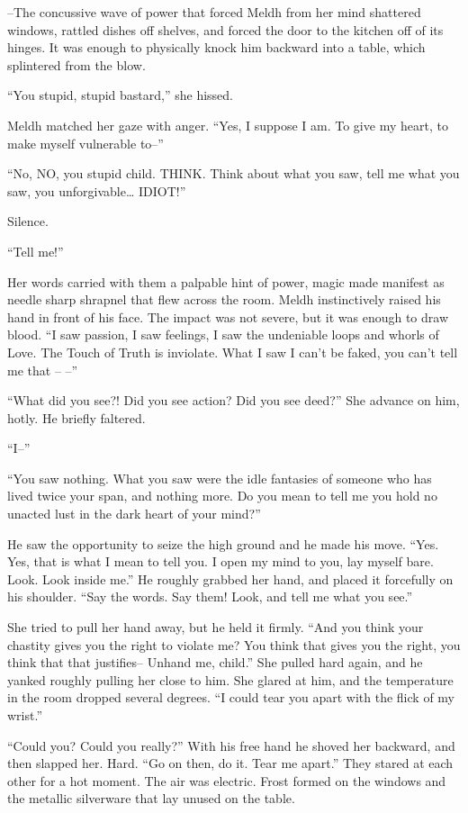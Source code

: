 –The concussive wave of power that forced Meldh from her mind shattered windows, rattled dishes off shelves, and forced the door to the kitchen off of its hinges. It was enough to physically knock him backward into a table, which splintered from the blow.

“You stupid, stupid bastard,” she hissed.

Meldh matched her gaze with anger. “Yes, I suppose I am. To give my heart, to make myself vulnerable to–”

“No, NO, you stupid child. THINK. Think about what you saw, tell me what you saw, you unforgivable… IDIOT!”

Silence.

“Tell me!”

Her words carried with them a palpable hint of power, magic made manifest as needle sharp shrapnel that flew across the room. Meldh instinctively raised his hand in front of his face. The impact was not severe, but it was enough to draw blood. “I saw passion, I saw feelings, I saw the undeniable loops and whorls of Love. The Touch of Truth is inviolate. What I saw I can’t be faked, you can’t tell me that – –”

“What did you see?! Did you see action? Did you see deed?” She advance on him, hotly. He briefly faltered.

“I–”

“You saw nothing. What you saw were the idle fantasies of someone who has lived twice your span, and nothing more. Do you mean to tell me you hold no unacted lust in the dark heart of your mind?”

He saw the opportunity to seize the high ground and he made his move. “Yes. Yes, that is what I mean to tell you. I open my mind to you, lay myself bare. Look. Look inside me.” He roughly grabbed her hand, and placed it forcefully on his shoulder. “Say the words. Say them! Look, and tell me what you see.”

She tried to pull her hand away, but he held it firmly. “And you think your chastity gives you the right to violate me? You think that gives you the right, you think that that justifies– Unhand me, child.” She pulled hard again, and he yanked roughly pulling her close to him. She glared at him, and the temperature in the room dropped several degrees. “I could tear you apart with the flick of my wrist.”

“Could you? Could you really?” With his free hand he shoved her backward, and then slapped her. Hard. “Go on then, do it. Tear me apart.” They stared at each other for a hot moment. The air was electric. Frost formed on the windows and the metallic silverware that lay unused on the table.

